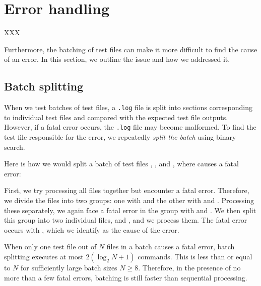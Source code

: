 \documentclass[final]{ltugboat}
\begin{document}
\section{Error handling}
\label{sec:error-handling}

XXX

Furthermore, the batching of test files can make it more difficult to find the cause of an error. In this section, we outline the issue and how we addressed it.

\subsection{Batch splitting}

When we test batches of test files, a \texttt{.log} file is split into sections corresponding to individual test files and compared with the expected test file outputs. However, if a fatal error occurs, the \texttt{.log} file may become malformed. To find the test file responsible for the error, we repeatedly \emph{split the batch} using binary search.

Here is how we would split a batch of test files , , and , where  causes a fatal error:

\medskip
\noindent
\begingroup
\centering

\par
\endgroup

\medskip
\noindent
First, we try processing all files together but encounter a fatal error. Therefore, we divide the files into two groups: one with  and the other with  and . Processing these separately, we again face a fatal error in the group with  and . We then split this group into two individual files,  and , and we process them. The fatal error occurs with , which we identify as the cause of the error.

When only one test file out of $N$ files in a batch causes a fatal error, batch splitting executes at most $2 (\log_2 N + 1)$ commands. This is less than or equal to $N$ for sufficiently large batch sizes $N\geq 8$. Therefore, in the presence of no more than a few fatal errors, batching is still faster than sequential processing.

\smallskip
\noindent
\begingroup
\centering

\par
\endgroup
\end{document}
